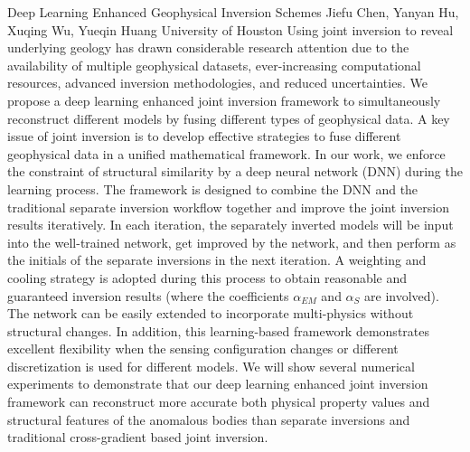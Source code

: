 \vspace{1.5ex}
\abs
{Deep Learning Enhanced Geophysical Inversion Schemes}
{Jiefu Chen, Yanyan Hu, Xuqing Wu, Yueqin Huang}
{University of Houston}
{Using joint inversion to reveal underlying geology has drawn considerable research attention due to the availability of multiple geophysical datasets, ever-increasing computational resources, advanced inversion methodologies, and reduced uncertainties. We propose a deep learning enhanced joint inversion framework to simultaneously reconstruct different models by fusing different types of geophysical data. A key issue of joint inversion is to develop effective strategies to fuse different geophysical data in a unified mathematical framework. In our work, we enforce the constraint of structural similarity by a deep neural network (DNN) during the learning process. The framework is designed to combine the DNN and the traditional separate inversion workflow together and improve the joint inversion results iteratively. In each iteration, the separately inverted models will be input into the well-trained network, get improved by the network, and then perform as the initials of the separate inversions in the next iteration. A weighting and cooling strategy is adopted during this process to obtain reasonable and guaranteed inversion results (where the coefficients $\alpha_{EM}$ and $\alpha_S$ are involved). The network can be easily extended to incorporate multi-physics without structural changes. In addition, this learning-based framework demonstrates excellent flexibility when the sensing configuration changes or different discretization is used for different models. We will show several numerical experiments to demonstrate that our deep learning enhanced joint inversion framework can reconstruct more accurate both physical property values and structural features of the anomalous bodies than separate inversions and traditional cross-gradient based joint inversion.}


